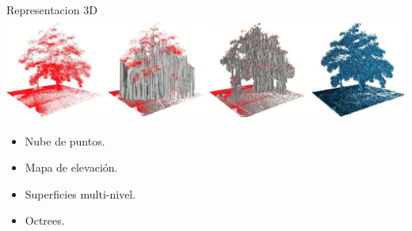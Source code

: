 \documentclass[
  24pt, %
  aspectratio=169, %
]{beamer}
\begin{document}
\begin{frame}{Representacion 3D}
  \bigskip %
  \includegraphics[width=1\textwidth,height=0.35\textheight]{img4}\footnotemark
  \vspace{2pt}\\
  \bigskip %
  
  \begin{itemize}
  \item Nube de puntos.
  \item Mapa de elevación.
  \item Superficies multi-nivel.
  \item Octrees.
  \end{itemize}
  
\end{frame}
\end{document}
